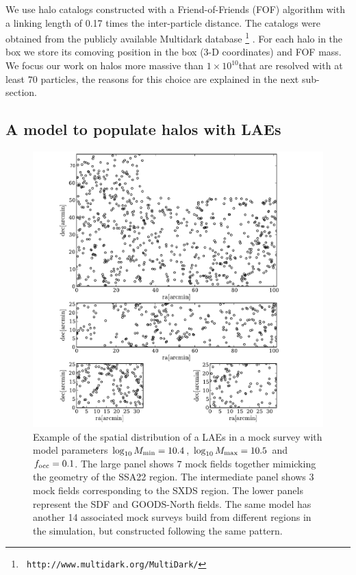 \documentclass[usenatbib]{mn2e}
\newcommand{\hMsun}{{\ifmmode{h^{-1}{\rm
        {M_{\odot}}}}\else{$h^{-1}{\rm{M_{\odot}}}$}\fi}}
\begin{document}
We use halo catalogs constructed with a Friend-of-Friends (FOF)
algorithm with a linking length of 0.17 times the inter-particle
distance. The catalogs were obtained from the publicly available
Multidark database \footnote{{\tt
    http://www.multidark.org/MultiDark/}}
\citep{MultiDark}. For each halo in the box we store its
comoving position in the box (3-D coordinates) and FOF mass. We focus our work
on halos more massive than $1\times 10^{10}$\hMsun that are resolved
with at least $70$ particles, the reasons for this choice are
explained in the next sub-section.  


\subsection{A model to populate halos with LAEs}
\label{subsec:mocks}



\begin{figure}
\begin{center}
\includegraphics[width=0.8\linewidth,angle=0]{Figure0.pdf}
\caption{ \label{fig:distros} Example of the spatial distribution of a LAEs in a mock
  survey with model parameters $\log_{10}M_{\rm min}=10.4$, $\log_{10}M_{\rm
    max}=10.5$ and $f_{\rm occ}=0.1$. The large panel shows $7$ mock
  fields together mimicking the geometry of the SSA22 region. The
  intermediate panel shows $3$ mock fields corresponding to the SXDS
  region. The lower panels represent the SDF and GOODS-North
  fields. The same model has another 14 associated mock surveys build
  from different regions in the simulation, but constructed following
  the same pattern.} 
\end{center} 
\end{figure}
\end{document}
